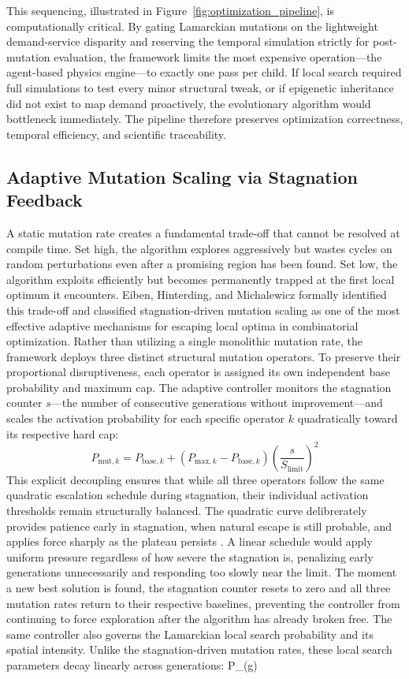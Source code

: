 {{This sequencing, illustrated in Figure~\ref{fig:optimization_pipeline}, is computationally critical. By gating Lamarckian mutations on the lightweight demand-service disparity and reserving the temporal simulation strictly for post-mutation evaluation, the framework limits the most expensive operation—the agent-based physics engine—to exactly one pass per child. If local search required full simulations to test every minor structural tweak, or if epigenetic inheritance did not exist to map demand proactively, the evolutionary algorithm would bottleneck immediately. The pipeline therefore preserves optimization correctness, temporal efficiency, and scientific traceability.

\subsection{Adaptive Mutation Scaling via Stagnation Feedback}\label{sec:adaptive}\noindent A static mutation rate creates a fundamental trade-off that cannot be resolved at compile time. Set high, the algorithm explores aggressively but wastes cycles on random perturbations even after a promising region has been found. Set low, the algorithm exploits efficiently but becomes permanently trapped at the first local optimum it encounters. Eiben, Hinterding, and Michalewicz \citeyearpar{eiben1999} formally identified this trade-off and classified stagnation-driven mutation scaling as one of the most effective adaptive mechanisms for escaping local optima in combinatorial optimization. Rather than utilizing a single monolithic mutation rate, the framework deploys three distinct structural mutation operators. To preserve their proportional disruptiveness, each operator is assigned its own independent base probability and maximum cap. The adaptive controller monitors the stagnation counter $s$---the number of consecutive generations without improvement---and scales the activation probability for each specific operator $k$ quadratically toward its respective hard cap:$$ P_{\text{mut}, k} = P_{\text{base}, k} + (P_{\text{max}, k} - P_{\text{base}, k}) \left(\frac{s}{S_{\text{limit}}}\right)^2 $$This explicit decoupling ensures that while all three operators follow the same quadratic escalation schedule during stagnation, their individual activation thresholds remain structurally balanced. The quadratic curve delibrerately provides patience early in stagnation, when natural escape is still probable, and applies force sharply as the plateau persists \citep{abulail2025, farda2024}. A linear schedule would apply uniform pressure regardless of how severe the stagnation is, penalizing early generations unnecessarily and responding too slowly near the limit. The moment a new best solution is found, the stagnation counter resets to zero and all three mutation rates return to their respective baselines, preventing the controller from continuing to force exploration after the algorithm has already broken free. The same controller also governs the Lamarckian local search probability and its spatial intensity. Unlike the stagnation-driven mutation rates, these local search parameters decay linearly across generations:$$ P_{}(g) }}
